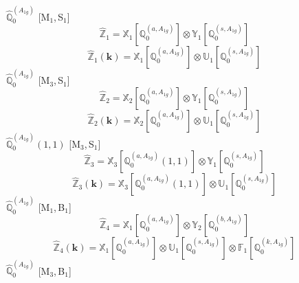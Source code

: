 \documentclass[fleqn,10pt,landscape]{article}
\begin{document}
\begin{itemize}
\vspace{4mm}
\noindent {} $\,\,\,\hat{\mathbb{Q}}_{0}^{(A_{1g})}$ [M$_{1}$,\,S$_{1}$]
\begin{dmath*}
\hat{\mathbb{Z}}_{1}=\mathbb{X}_{1}[\mathbb{Q}_{0}^{(a,A_{1g})}] \otimes\mathbb{Y}_{1}[\mathbb{Q}_{0}^{(s,A_{1g})}]
\end{dmath*}
\begin{dmath*}
\hat{\mathbb{Z}}_{1}(\bm{k})=\mathbb{X}_{1}[\mathbb{Q}_{0}^{(a,A_{1g})}] \otimes\mathbb{U}_{1}[\mathbb{Q}_{0}^{(s,A_{1g})}]
\end{dmath*}
\vspace{4mm}
\noindent {} $\,\,\,\hat{\mathbb{Q}}_{0}^{(A_{1g})}$ [M$_{3}$,\,S$_{1}$]
\begin{dmath*}
\hat{\mathbb{Z}}_{2}=\mathbb{X}_{2}[\mathbb{Q}_{0}^{(a,A_{1g})}] \otimes\mathbb{Y}_{1}[\mathbb{Q}_{0}^{(s,A_{1g})}]
\end{dmath*}
\begin{dmath*}
\hat{\mathbb{Z}}_{2}(\bm{k})=\mathbb{X}_{2}[\mathbb{Q}_{0}^{(a,A_{1g})}] \otimes\mathbb{U}_{1}[\mathbb{Q}_{0}^{(s,A_{1g})}]
\end{dmath*}
\vspace{4mm}
\noindent {} $\,\,\,\hat{\mathbb{Q}}_{0}^{(A_{1g})}(1,1)$ [M$_{3}$,\,S$_{1}$]
\begin{dmath*}
\hat{\mathbb{Z}}_{3}=\mathbb{X}_{3}[\mathbb{Q}_{0}^{(a,A_{1g})}(1,1)] \otimes\mathbb{Y}_{1}[\mathbb{Q}_{0}^{(s,A_{1g})}]
\end{dmath*}
\begin{dmath*}
\hat{\mathbb{Z}}_{3}(\bm{k})=\mathbb{X}_{3}[\mathbb{Q}_{0}^{(a,A_{1g})}(1,1)] \otimes\mathbb{U}_{1}[\mathbb{Q}_{0}^{(s,A_{1g})}]
\end{dmath*}
\vspace{4mm}
\noindent {} $\,\,\,\hat{\mathbb{Q}}_{0}^{(A_{1g})}$ [M$_{1}$,\,B$_{1}$]
\begin{dmath*}
\hat{\mathbb{Z}}_{4}=\mathbb{X}_{1}[\mathbb{Q}_{0}^{(a,A_{1g})}] \otimes\mathbb{Y}_{2}[\mathbb{Q}_{0}^{(b,A_{1g})}]
\end{dmath*}
\begin{dmath*}
\hat{\mathbb{Z}}_{4}(\bm{k})=\mathbb{X}_{1}[\mathbb{Q}_{0}^{(a,A_{1g})}] \otimes\mathbb{U}_{1}[\mathbb{Q}_{0}^{(s,A_{1g})}] \otimes\mathbb{F}_{1}[\mathbb{Q}_{0}^{(k,A_{1g})}]
\end{dmath*}
\vspace{4mm}
\noindent {} $\,\,\,\hat{\mathbb{Q}}_{0}^{(A_{1g})}$ [M$_{3}$,\,B$_{1}$]
\begin{dmath*}

\end{dmath*}
\end{itemize}
\end{document}
